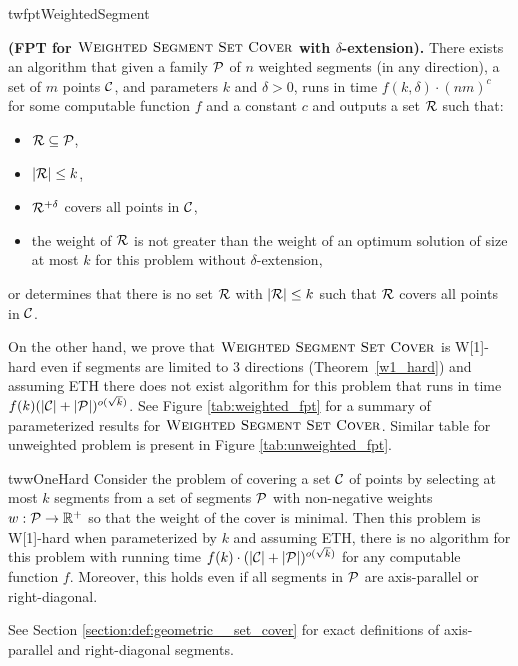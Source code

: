 \begin{restatable}{tw}{fptWeightedSegment}{
	\label{fpt_weighted_segment}
	\textbf{(FPT for $\textsc{Weighted Segment Set Cover}$ with $\delta$-extension).}
	There exists an algorithm that given a family $\mathcal{P}$ of
	$n$ weighted segments (in any direction),
	a set of $m$ points $\mathcal{C}$, and parameters $k$ and $\delta > 0$,
	runs in time $f(k, \delta) \cdot (nm)^c$ for some computable function $f$ and a constant $c$ and
	outputs a set $\mathcal{R}$ such that:
	\begin{itemize}
	\item $\mathcal{R} \subseteq \mathcal{P}$,
	\item $|\mathcal{R}| \le k$,
	\item $\mathcal{R}^{+\delta}$ covers all points in $\mathcal{C}$,
	\item the weight of $\mathcal{R}$ is not greater than the weight
	of an optimum solution of size at most $k$
	for this problem without $\delta$-extension,
	\end{itemize}
	or determines that there is no set $\mathcal{R}$ with $|\mathcal{R}| \le k$
	such that $\mathcal{R}$ covers all points in $\mathcal{C}$.
}\end{restatable}

On the other hand, we prove that $\textsc{Weighted Segment Set Cover}$ 
is W[1]-hard even if segments are limited to 3 directions (Theorem~\ref{w1_hard})
and assuming ETH there does not exist algorithm for this problem
that runs in time ${f(k)(|\mathcal{C}| + |\mathcal{P}|)^{o(\sqrt{k})}}$.
See Figure \ref{tab:weighted_fpt} for a summary of parameterized
results for $\textsc{Weighted Segment Set Cover}$.
Similar table for unweighted problem is present in Figure \ref{tab:unweighted_fpt}.

\begin{restatable}{tw}{wOneHard}
\label{w1_hard}
	Consider the problem of covering a set $\mathcal{C}$ of points
	by selecting at most $k$ segments
	from a set of segments $\mathcal{P}$ 
	with non-negative weights $w : \mathcal{P} \rightarrow \mathbb{R^+}$
	so that the weight of the cover is minimal.
	Then this problem is W[1]-hard when parameterized by $k$ and
	assuming ETH, there is no algorithm for this
	problem with running time
	$f(k)\cdot(|\mathcal{C}| + |\mathcal{P}|)^{o(\sqrt{k})}$
	for any computable function $f$.
	Moreover, this holds even if all segments in $\mathcal{P}$
	are axis-parallel or right-diagonal.
\end{restatable}

See Section \ref{section:def:geometric__set_cover}
for exact definitions of axis-parallel and right-diagonal segments.

